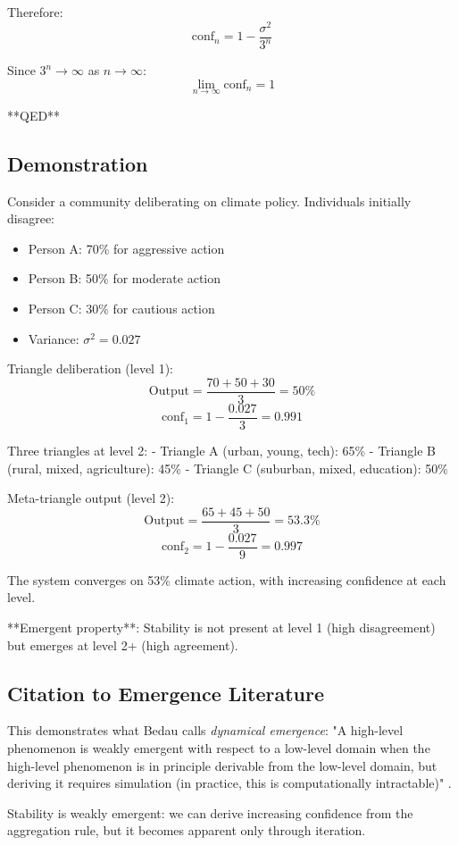 \documentclass[12pt,a4paper]{article}
\theoremstyle{definition}
\begin{document}
Therefore:
$$\text{conf}_n = 1 - \frac{\sigma^2}{3^n}$$

Since $3^n \to \infty$ as $n \to \infty$:
$$\lim_{n \to \infty} \text{conf}_n = 1$$

**QED**

\subsection{Demonstration}

Consider a community deliberating on climate policy. Individuals initially disagree:
\begin{itemize}
    \item Person A: 70\% for aggressive action
    \item Person B: 50\% for moderate action
    \item Person C: 30\% for cautious action
    \item Variance: $\sigma^2 = 0.027$
\end{itemize}

Triangle deliberation (level 1):
$$\text{Output} = \frac{70 + 50 + 30}{3} = 50\%$$
$$\text{conf}_1 = 1 - \frac{0.027}{3} = 0.991$$

Three triangles at level 2:
- Triangle A (urban, young, tech): 65\%
- Triangle B (rural, mixed, agriculture): 45\%
- Triangle C (suburban, mixed, education): 50\%

Meta-triangle output (level 2):
$$\text{Output} = \frac{65 + 45 + 50}{3} = 53.3\%$$
$$\text{conf}_2 = 1 - \frac{0.027}{9} = 0.997$$

The system converges on 53\% climate action, with increasing confidence at each level.

**Emergent property**: Stability is not present at level 1 (high disagreement) but emerges at level 2+ (high agreement).

\subsection{Citation to Emergence Literature}

This demonstrates what Bedau calls \textit{dynamical emergence}: "A high-level phenomenon is weakly emergent with respect to a low-level domain when the high-level phenomenon is in principle derivable from the low-level domain, but deriving it requires simulation (in practice, this is computationally intractable)" \citep{bedau2002dynamical}.

Stability is weakly emergent: we can derive increasing confidence from the aggregation rule, but it becomes apparent only through iteration.
\end{document}
